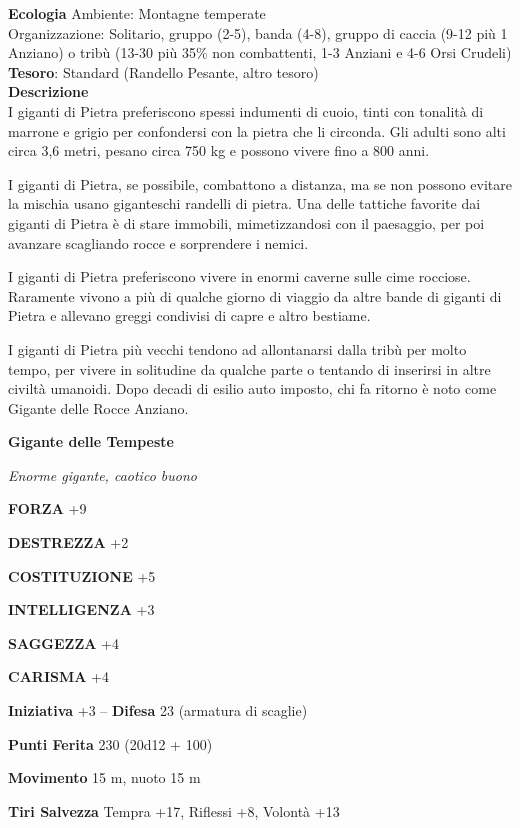 \begin{multicols}{2}
	\textbf{Ecologia}
	Ambiente: Montagne temperate\\
	Organizzazione: Solitario, gruppo (2-5), banda (4-8), gruppo di caccia (9-12 più 1 Anziano) o tribù (13-30 più 35\% non combattenti, 1-3 Anziani e 4-6 Orsi Crudeli)\\
	\textbf{Tesoro}: Standard (Randello Pesante, altro tesoro)\\
	\textbf{Descrizione}\\
	I giganti di Pietra preferiscono spessi indumenti di cuoio, tinti con tonalità di marrone e grigio per confondersi con la pietra che li circonda. Gli adulti sono alti circa 3,6 metri, pesano circa 750 kg e possono vivere fino a 800 anni.

	I giganti di Pietra, se possibile, combattono a distanza, ma se non possono evitare la mischia usano giganteschi randelli di pietra. Una delle tattiche favorite dai giganti di Pietra è di stare immobili, mimetizzandosi con il paesaggio, per poi avanzare scagliando rocce e sorprendere i nemici.

	I giganti di Pietra preferiscono vivere in enormi caverne sulle cime rocciose. Raramente vivono a più di qualche giorno di viaggio da altre bande di giganti di Pietra e allevano greggi condivisi di capre e altro bestiame.

	I giganti di Pietra più vecchi tendono ad allontanarsi dalla tribù per molto tempo, per vivere in solitudine da qualche parte o tentando di inserirsi in altre civiltà umanoidi. Dopo decadi di esilio auto imposto, chi fa ritorno è noto come Gigante delle Rocce Anziano.


	\medskip{}\textbf{Gigante delle Tempeste}

	\textit{Enorme gigante, caotico buono}

	\textbf{FORZA} +9

	\textbf{DESTREZZA} +2

	\textbf{COSTITUZIONE} +5

	\textbf{INTELLIGENZA} +3

	\textbf{SAGGEZZA} +4

	\textbf{CARISMA} +4

	\textbf{Iniziativa} +3 -- \textbf{Difesa} 23 (armatura di scaglie)

	\textbf{Punti Ferita} 230 (20d12 + 100)

	\textbf{Movimento} 15 m, nuoto 15 m

	\textbf{Tiri Salvezza} Tempra +17, Riflessi +8, Volontà +13


\end{multicols}
